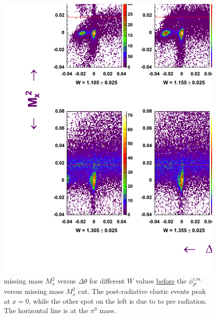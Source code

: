 \begin{figure}[h]
 \begin{center}
 \includegraphics[width = 15.2cm, bb=40 40 1220 1000]{data_reduction/img/bh_mm_dth_before} 
  \caption[missing mass $M_x^2$  versus $\Delta\theta$ for different $W$ values before
          the $\phi_P^{c.m.}$ versus missing mass $M_x^2$ cut]
          { missing mass $M_x^2$  versus $\Delta\theta$ for different $W$ values \underline{before}     the
                     $\phi_P^{c.m.}$ versus missing mass $M_x^2$ cut. The post-radiative 
                     elastic events peak at $x=0$, while the other spot on the left is due to to pre radiation. 
		     The horizontal line is at the $\pi^0$ mass.}
 \label{fig:bh_mm_dth_before}
 \end{center}
\end{figure}
\cia



